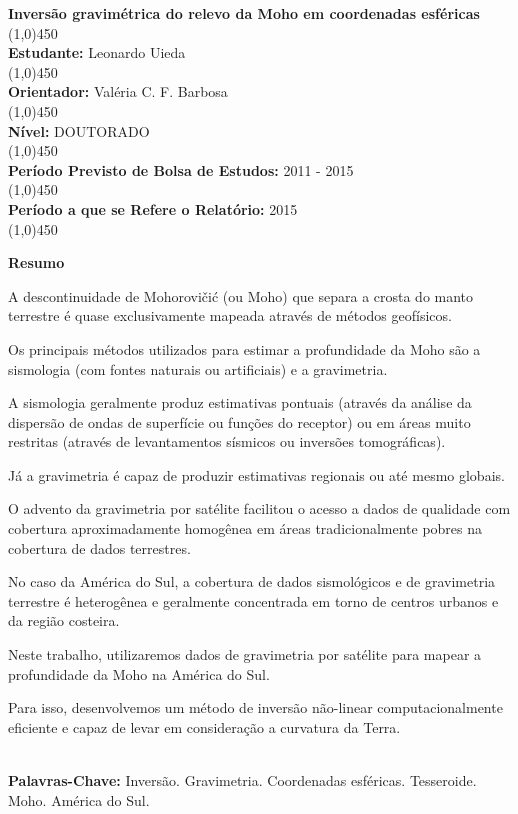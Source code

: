 \documentclass[12pt]{letter}
\begin{document}
\thispagestyle{fancy}

\begin{flushleft}

\textbf{Inversão gravimétrica do relevo da Moho em coordenadas esféricas}\\
\line(1,0){450}
\\\textbf{Estudante:} Leonardo Uieda\\
\line(1,0){450}
\\\textbf{Orientador:} Valéria C. F. Barbosa\\
\line(1,0){450}
\\\textbf{Nível:} DOUTORADO\\
\line(1,0){450}
\\\textbf{Período Previsto de Bolsa de Estudos:} 2011 - 2015\\
\line(1,0){450}
\\\textbf{Período a que se Refere o Relatório:} 2015\\
\line(1,0){450}

\textbf{Resumo}
\\
\vspace{10 mm}

A descontinuidade de Mohorovičić (ou Moho) que separa a crosta do manto
terrestre é quase exclusivamente mapeada através de métodos geofísicos.

Os principais métodos utilizados para estimar a profundidade da Moho são a
sismologia (com fontes naturais ou artificiais) e a gravimetria.

A sismologia geralmente produz estimativas pontuais (através da análise da
dispersão de ondas de superfície ou funções do receptor) ou em áreas muito
restritas (através de levantamentos sísmicos ou inversões tomográficas).

Já a gravimetria é capaz de produzir estimativas regionais ou até mesmo
globais.

O advento da gravimetria por satélite facilitou o acesso a dados de qualidade
com cobertura aproximadamente homogênea em áreas tradicionalmente pobres na
cobertura de dados terrestres.

No caso da América do Sul, a cobertura de dados sismológicos e de gravimetria
terrestre é heterogênea e geralmente concentrada em torno de centros urbanos e
da região costeira.

Neste trabalho, utilizaremos dados de gravimetria por satélite para mapear a
profundidade da Moho na América do Sul.

Para isso, desenvolvemos um método de inversão não-linear computacionalmente
eficiente e capaz de levar em consideração a curvatura da Terra.



\\

\vspace{10 mm}
\textbf{Palavras-Chave:}
Inversão. Gravimetria. Coordenadas esféricas. Tesseroide. Moho. América do Sul.

\end{flushleft}
\end{document}

